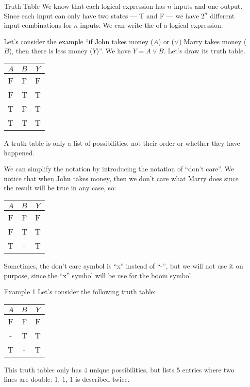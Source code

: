 \documentclass[a4paper]{article}
\begin{document}
\begin{parag}{Truth Table}
    We know that each logical expression has $n$ inputs and one output. Since each input can only have two states --- T and F --- we have $2^n$ different input combinations for $n$ inputs. We can write the  of a logical expression.

    Let's consider the example ``if John takes money ($A$) or ($\lor$) Marry takes money ($B$), then there is less money ($Y$)''. We have $Y = A \lor B$. Let's draw its truth table.

    \begin{center}
        \begin{tabular}{c|c|c}
            $A$ & $B$ & $Y$ \\
            \hline
            F & F & F \\
            F & T & T \\
            T & F & T \\
            T & T & T
        \end{tabular}
    \end{center}

    A truth table is only a list of possibilities, not their order or whether they have happened. 

    We can simplify the notation by introducing the notation of ``don't care''. We notice that when John takes money, then we don't care what Marry does since the result will be true in any case, so: 
    \begin{center}
        \begin{tabular}{c|c|c}
            $A$ & $B$ & $Y$ \\
            \hline
            F & F & F \\
            F & T & T \\
            T & - & T
        \end{tabular}
    \end{center}

    Sometimes, the don't care symbol is ``x'' instead of ``-'', but we will not use it on purpose, since the ``x'' symbol will be use for the boom symbol.
\end{parag}

\begin{parag}{Example 1}
    Let's consider the following truth table:
    \begin{center}
        \begin{tabular}{c|c|c}
            $A$ & $B$ & $Y$ \\
            \hline
            F & F & F \\
            - & T & T \\
            T & - & T 
        \end{tabular}
    \end{center}
    
    This truth tables only has 4 unique possibilities, but lists 5 entries where two lines are double: 1, 1, 1 is described twice. 
\end{parag}
\end{document}
